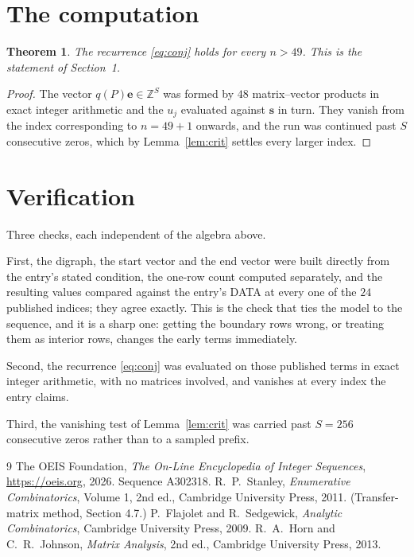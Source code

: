 \documentclass[11pt,a4paper]{article}
\theoremstyle{plain}
\newtheorem{theorem}{Theorem}
\theoremstyle{definition}
\begin{document}
\section{The computation}

\begin{theorem}
The recurrence \eqref{eq:conj} holds for every $n>49$. This is the statement of
Section~1.
\end{theorem}

\begin{proof}
The vector $q(P)\mathbf{e}\in\mathbb{Z}^{S}$ was formed by $48$ matrix--vector
products in exact integer arithmetic and the $u_j$ evaluated against $\mathbf{s}$ in turn.
They vanish from the index corresponding to $n=49+1$ onwards, and the run was continued
past $S$ consecutive zeros, which by Lemma~\ref{lem:crit} settles every larger index.
\end{proof}

\section{Verification}

Three checks, each independent of the algebra above.

First, the digraph, the start vector and the end vector were built directly from the
entry's stated condition, the one-row count computed separately, and the resulting values
compared against the entry's DATA at every one of the $24$ published indices; they
agree exactly. This is the check that ties the model to the sequence, and it is a sharp one:
getting the boundary rows wrong, or treating them as interior rows, changes the early terms
immediately.

Second, the recurrence \eqref{eq:conj} was evaluated on those published terms in exact
integer arithmetic, with no matrices involved, and vanishes at every index the entry claims.

Third, the vanishing test of Lemma~\ref{lem:crit} was carried past $S=256$ consecutive
zeros rather than to a sampled prefix.

\begin{thebibliography}{9}
 The OEIS Foundation, \emph{The On-Line Encyclopedia of Integer
Sequences}, \url{https://oeis.org}, 2026. Sequence A302318.
 R.~P.~Stanley, \emph{Enumerative Combinatorics}, Volume 1, 2nd ed.,
Cambridge University Press, 2011. (Transfer-matrix method, Section 4.7.)
 P.~Flajolet and R.~Sedgewick, \emph{Analytic Combinatorics}, Cambridge
University Press, 2009.
 R.~A.~Horn and C.~R.~Johnson, \emph{Matrix Analysis}, 2nd ed., Cambridge
University Press, 2013.
\end{thebibliography}
\end{document}
